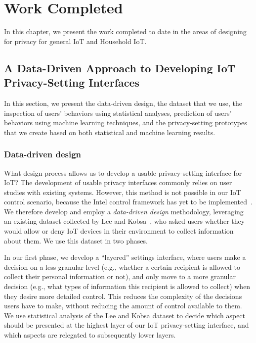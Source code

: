 \chapter{Work Completed}
In this chapter, we present the work completed to date in the areas of designing for privacy for general IoT and Household IoT.

\section{A Data-Driven Approach to Developing IoT Privacy-Setting Interfaces}
In this section, we present the data-driven design, the dataset that we use, the inspection of users' behaviors using statistical analyses, prediction of users' behaviors using machine learning techniques, and the privacy-setting prototypes that we create based on both statistical and machine learning results.

\subsection{Data-driven design}
What design process allows us to develop a usable privacy-setting interface for IoT? The development of usable privacy interfaces commonly relies on user studies with existing systems. However, this method is not possible in our IoT control scenario, because the Intel control framework has yet to be implemented~\cite{chow2015hci}. We therefore develop and employ a \emph{data-driven design} methodology, leveraging an existing dataset collected by Lee and Kobsa~\cite{lee2016understanding}, who asked users whether they would allow or deny IoT devices in their environment to collect information about them. We use this dataset in two phases. 

In our first phase, we develop a ``layered'' settings interface, where users make a decision on a less granular level (e.g., whether a certain recipient is allowed to collect their personal information or not), and only move to a more granular decision (e.g., what types of information this recipient is allowed to collect) when they desire more detailed control. This reduces the complexity of the decisions users have to make, without reducing the amount of control available to them. We use statistical analysis of the Lee and Kobsa dataset to decide which aspect should be presented at the highest layer of our IoT privacy-setting interface, and which aspects are relegated to subsequently lower layers.

